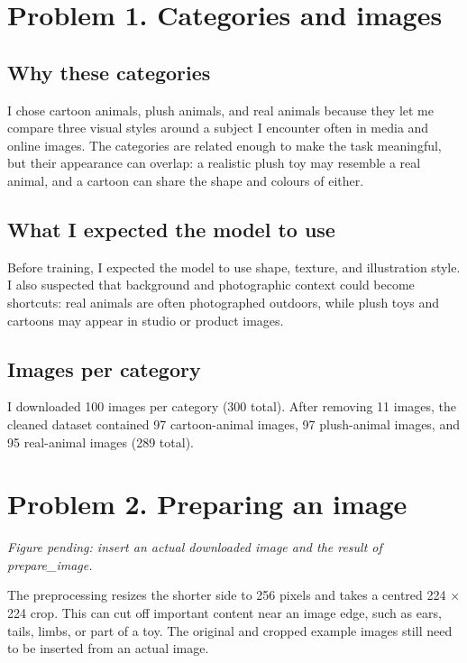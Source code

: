 \documentclass[11pt]{article}
\begin{document}
\makeheader

\section*{Problem 1. Categories and images}

\subsection*{Why these categories}
I chose cartoon animals, plush animals, and real animals because they let me compare three visual styles around a subject I encounter often in media and online images. The categories are related enough to make the task meaningful, but their appearance can overlap: a realistic plush toy may resemble a real animal, and a cartoon can share the shape and colours of either.

\subsection*{What I expected the model to use}
Before training, I expected the model to use shape, texture, and illustration style. I also suspected that background and photographic context could become shortcuts: real animals are often photographed outdoors, while plush toys and cartoons may appear in studio or product images.

\subsection*{Images per category}
I downloaded 100 images per category (300 total). After removing 11 images, the cleaned dataset contained 97 cartoon-animal images, 97 plush-animal images, and 95 real-animal images (289 total).

\section*{Problem 2. Preparing an image}

\textit{Figure pending: insert an actual downloaded image and the result of prepare\_image.}

The preprocessing resizes the shorter side to 256 pixels and takes a centred 224 × 224 crop. This can cut off important content near an image edge, such as ears, tails, limbs, or part of a toy. The original and cropped example images still need to be inserted from an actual image.
\end{document}
